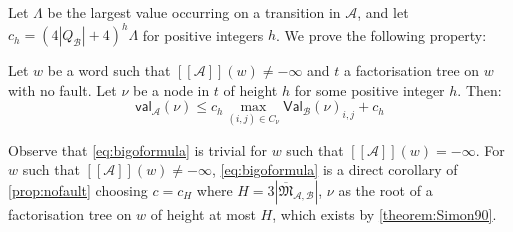\documentclass{lmcs}
\theoremstyle{remark}
\newcommand{\ideal}{\mathfrak{M}}
\newcommand{\autA}{\mathcal{A}}
\newcommand{\autB}{\mathcal{B}}
\newcommand{\brfunc}[1]{[\![#1]\!]}
\newcommand{\funcA}{\brfunc{\autA}}
\newcommand{\aval}{\mathsf{val}_\autA}
\newcommand{\bval}{\mathsf{Val}_\autB}
\theoremstyle{remark}
\begin{document}
Let $\Lambda$ be the largest value occurring on a transition in $\autA$, and let $c_h = (4|Q_\mathcal{B}|+4)^{h}\Lambda$ for positive integers $h$. We prove the following property:

\begin{prop}
\label{prop:nofault}
Let $w$ be a word such that $\funcA(w) \neq -\infty$ and $t$ a factorisation tree on $w$ with no fault. Let $\nu$ be a node in $t$ of height $h$ for some positive integer $h$. Then:
\[ \aval(\nu) \leq c_h \max_{(i,j) \in C_{\nu}} \bval(\nu)_{i,j} + c_h\]
\end{prop}

Observe that \cref{eq:bigoformula} is trivial for $w$ such that $\funcA(w) = -\infty$. For $w$ such that $\funcA(w) \neq -\infty$,  \cref{eq:bigoformula} is a direct corollary of \cref{prop:nofault} choosing $c=c_H$ where $H = 3|\overline{\ideal}_{\autA,\autB}|$, $\nu$ as the root of a factorisation tree on $w$ of height at most $H$, which exists by \cref{theorem:Simon90}.
\end{document}
